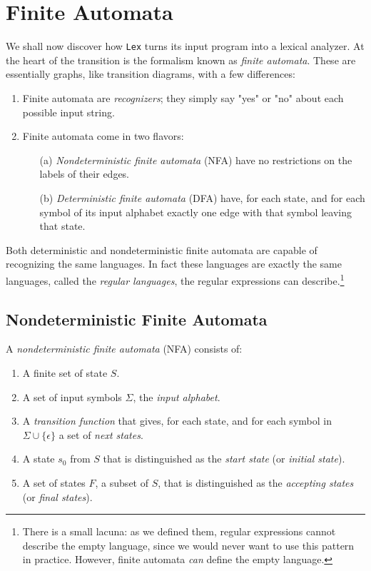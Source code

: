 \documentclass[12pt,a4paper,twoside,openany]{book}
\begin{document}
\section{Finite Automata}
We shall now discover how \verb|Lex| turns its input program into a lexical analyzer. At the heart of the transition is the formalism known as \textit{finite automata}. These are essentially graphs, like transition diagrams, with a few differences:
\begin{enumerate}
    \item Finite automata are \textit{recognizers};  they simply say "yes" or "no" about each possible input string.
    \item Finite automata come in two flavors:
    \begin{itemize}
        \item[(a)]\textit{Nondeterministic finite automata} (NFA) have no restrictions on the labels of their edges.
        \item[(b)]\textit{Deterministic finite automata} (DFA) have, for each state, and for each symbol of its input alphabet exactly one edge with that symbol leaving that state.
    \end{itemize}
\end{enumerate}

Both deterministic and nondeterministic finite automata are capable of recognizing the same languages. In fact these languages are exactly the same languages, called the \textit{regular languages}, the regular expressions can describe.\footnote{There is a small lacuna: as we defined them, regular expressions cannot describe the empty language, since we would never want to use this pattern in practice. However, finite automata \textit{can} define the empty language.}

\subsection{Nondeterministic Finite Automata}

A \textit{nondeterministic finite automata} (NFA) consists of:
\begin{enumerate}
    \item A finite set of state $S$.
    \item A set of input symbols $\Sigma$, the \textit{input alphabet}.
    \item A \textit{transition function} that gives, for each state, and for each symbol in $\Sigma\cup\{\epsilon\}$ a set of \textit{next states}.
    \item A state $s_0$ from $S$ that is distinguished as the \textit{start state} (or \textit{initial state}).
    \item A set of states $F$, a subset of $S$, that is distinguished as the \textit{accepting states} (or \textit{final states}).
\end{enumerate}
 
\end{document}
